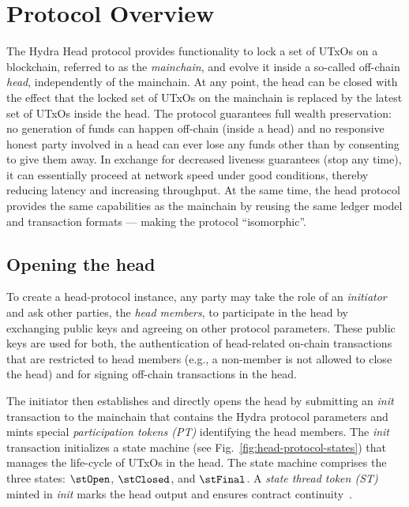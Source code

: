 \section{Protocol Overview}\label{sec:overview}

The Hydra Head protocol provides functionality to lock a set of UTxOs on a
blockchain, referred to as the \emph{mainchain}, and evolve it inside a
so-called off-chain \emph{head}, independently of the mainchain. At any point,
the head can be closed with the effect that the locked set of UTxOs on the
mainchain is replaced by the latest set of UTxOs inside the head. The protocol
guarantees full wealth preservation: no generation of funds can happen off-chain
(inside a head) and no responsive honest party involved in a head can ever lose
any funds other than by consenting to give them away. In exchange for decreased
liveness guarantees (stop any time), it can essentially proceed at network speed
under good conditions, thereby reducing latency and increasing throughput. At
the same time, the head protocol provides the same capabilities as the mainchain
by reusing the same ledger model and transaction formats --- making the protocol
``isomorphic''.

\subsection{Opening the head}

To create a head-protocol instance, any party may take the role of an
\emph{initiator} and ask other parties, the \emph{head members}, to participate
in the head by exchanging public keys and agreeing on other protocol parameters.
These public keys are used for both, the authentication of head-related on-chain
transactions that are restricted to head members (e.g., a non-member is not
allowed to close the head) and for signing off-chain transactions in the head.

The initiator then establishes and directly opens the head by submitting an
\emph{init} transaction to the mainchain that contains the Hydra protocol
parameters and mints special \emph{participation tokens (PT)} identifying the
head members. The \emph{init} transaction initializes a state machine (see
Fig.~\ref{fig:head-protocol-states}) that manages the life-cycle of UTxOs in the
head. The state machine comprises the three states: $\stOpen$, $\stClosed$, and
$\stFinal$. A \emph{state thread token (ST)} minted in \emph{init} marks the
head output and ensures contract continuity~\cite{eutxo}.

